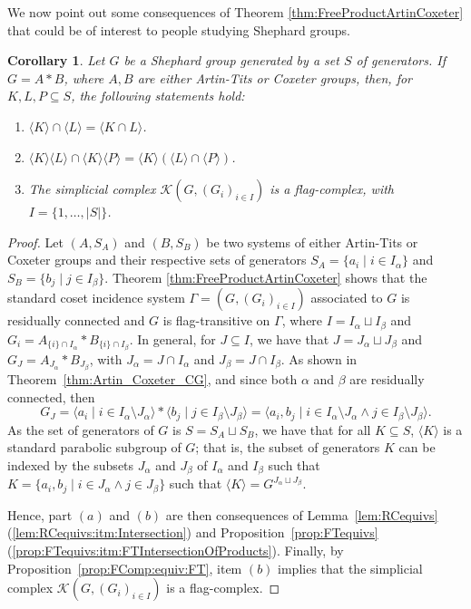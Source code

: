 \documentclass[11pt,letterpaper]{amsart}
\newtheorem{coro}[prop]{Corollary}
\newcommand{\KK}{\mathcal{K}}
\begin{document}
We now point out some consequences of Theorem \ref{thm:FreeProductArtinCoxeter} that could be of interest to people studying Shephard groups.
\begin{coro} \label{coro:FreeProductArtinCoxeter}
    Let $G$ be a Shephard group generated by a set $S$ of generators. If $G=A*B$, where $A,B$ are either Artin-Tits or Coxeter groups, then, for $K,L,P\subseteq S$, the following statements hold:
    \begin{enumerate}
        \item $\langle K\rangle \cap \langle L\rangle = \langle K\cap L\rangle$.
        \item $\langle K\rangle\langle L\rangle\cap \langle K\rangle\langle P\rangle = \langle K\rangle(\langle L\rangle\cap \langle P\rangle)$.
        \item The simplicial complex $\mathcal{K}(G,(G_i)_{i\in I})$ is a flag-complex, with $I=\{1,\ldots,|S|\}$.
    \end{enumerate}
\end{coro}
\begin{proof}
Let $(A,S_A)$ and $(B,S_B)$ be two systems of either Artin-Tits or Coxeter groups and their respective sets of generators $S_A=\{a_i\mid i\in I_\alpha\}$ and $S_B=\{b_j\mid j\in I_\beta\}$.
    Theorem \ref{thm:FreeProductArtinCoxeter} shows that the standard coset incidence system $\Gamma=(G,(G_i)_{i\in I})$ associated to $G$ is residually connected and $G$ is flag-transitive on $\Gamma$, where $I=I_\alpha\sqcup I_\beta$ and $G_i= A_{\{i\}\cap I_\alpha}* B_{\{i\}\cap I_\beta}$.
    In general, for $J\subseteq I$, we have that $J=J_\alpha\sqcup J_\beta$ and $G_J = A_{J_\alpha}*B_{J_\beta}$, with $J_\alpha=J\cap I_\alpha$ and $J_\beta=J\cap I_\beta$. As shown in Theorem~\ref{thm:Artin_Coxeter_CG}, and since both $\alpha$ and $\beta$ are residually connected, then $$G_J = \langle a_i \mid i\in I_\alpha\setminus J_\alpha\rangle*\langle b_j \mid j\in I_\beta\setminus J_\beta\rangle = \langle a_i,b_j\mid i\in I_\alpha\setminus J_\alpha \wedge j\in I_\beta\setminus J_\beta\rangle.$$
    As the set of generators of $G$ is $S=S_A\sqcup S_B$, we have that for all $K\subseteq S$, $\langle K\rangle$ is a standard parabolic subgroup of $G$; that is, the subset of generators $K$ can be indexed by the subsets $J_\alpha$ and $J_\beta$ of $I_\alpha$ and $I_\beta$ such that $K=\{a_i,b_j\mid i\in J_\alpha\wedge j\in J_\beta\}$ such that $\langle K\rangle = G^{J_\alpha\sqcup J_\beta}$.

    Hence, part $(a)$ and $(b)$ are then consequences of Lemma~\ref{lem:RCequivs}(\ref{lem:RCequivs:itm:Intersection}) and Proposition~\ref{prop:FTequivs}(\ref{prop:FTequivs:itm:FTIntersectionOfProducts}).
    Finally, by Proposition~\ref{prop:FComp:equiv:FT}, item $(b)$ implies that the simplicial complex $\KK(G,(G_i)_{i\in I})$ is a flag-complex.

\end{proof}
\end{document}
